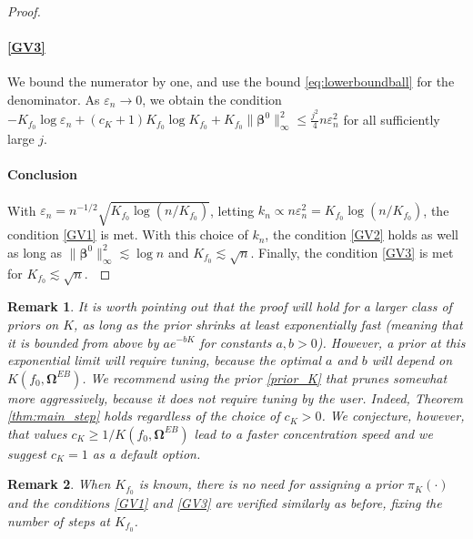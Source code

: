 \documentclass{article}
\newcommand{\1}{\mathbb{I}}
\newcommand{\e}{\varepsilon}
\newcommand{\bm}[1]{\boldsymbol{#1}}
\def\b{\bm{\beta}}
\def\b{\bm{\beta}}
\newcommand{\st}[1]{ \textbf{\color{red}#1} } %
\newtheorem{remark}{Remark}[section]
\theoremstyle{assumption}
\begin{document}
\begin{proof}
\paragraph{\ref{GV3}}
We bound the numerator by one, and use the bound \eqref{eq:lowerboundball} for the denominator. As  $\e_n \to 0$, we obtain the condition {${-K_{f_0} \log{\e_n}}+(c_K+1)K_{f_0}\log K_{f_0}+K_{f_0}\|\b^0\|_{\infty}^2 \leq {\frac{j^2}{4}n\e_n^2}$} for all sufficiently large $j$.

\paragraph{Conclusion}
With {$\e_n = n^{-1/2}\sqrt{K_{f_0}\log(n/K_{f_0})}$}, letting $k_n\propto n\e_n^2=K_{f_0}\log(n/K_{f_0})$, the condition \ref{GV1} is met. With this choice of $k_n$, the condition {\ref{GV2}} holds as well as long as $\|\b^0\|_\infty^2\lesssim \log n$ and $K_{f_0}\lesssim\sqrt{n}$.
Finally, the condition \ref{GV3} is met for $K_{f_0}\lesssim\sqrt{n}$. $\qedhere$ 


\end{proof}
\vspace{-0.3cm}
\begin{remark}It is worth pointing out that the proof will hold for a larger class of priors on $K$, as long as the prior shrinks at least exponentially fast (meaning that it is bounded from above by $ae^{-bK}$ for constants $a, b > 0$). However, a prior at this exponential limit will require tuning, because the optimal $a$ and $b$ will depend on $K(f_0,\bm{\Omega}^{EB})$. We recommend using the prior \eqref{prior_K} that prunes somewhat more aggressively,  because it does not require tuning by the user. Indeed, Theorem \ref{thm:main_step} holds  regardless of the choice of $c_K>0$. We conjecture, however,  that values $c_K \geq 1/K(f_0,\bm{\Omega}^{EB})$ lead to a faster concentration speed and we suggest $c_K=1$ as a default option.
\end{remark}
\begin{remark}\label{remark}
When $K_{f_0}$ is known, there is no need for assigning a prior $\pi_K(\cdot)$ and the conditions  \ref{GV1} and  \ref{GV3} are verified similarly as before, fixing the number of steps at $K_{f_0}$.
\end{remark}
\end{document}
